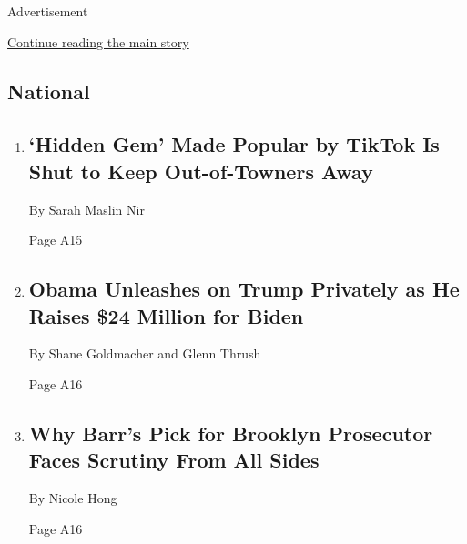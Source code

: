 Advertisement

\protect\hyperlink{after-mid2}{Continue reading the main story}

\hypertarget{national}{%
\subsection{National}\label{national}}

\begin{enumerate}
\def\labelenumi{\arabic{enumi}.}
\item
  \href{/2020/07/29/nyregion/lake-solitude-closed-racism.html}{}

  \hypertarget{hidden-gem-made-popular-by-tiktok-is-shut-to-keep-out-of-towners-away}{%
  \subsection{`Hidden Gem' Made Popular by TikTok Is Shut to Keep
  Out-of-Towners
  Away}\label{hidden-gem-made-popular-by-tiktok-is-shut-to-keep-out-of-towners-away}}

  By Sarah Maslin Nir

  Page A15
\item
  \href{/2020/07/30/us/politics/obama-trump-biden.html}{}

  \hypertarget{obama-unleashes-on-trump-privately-as-he-raises-24-million-for-biden}{%
  \subsection{Obama Unleashes on Trump Privately as He Raises \$24
  Million for
  Biden}\label{obama-unleashes-on-trump-privately-as-he-raises-24-million-for-biden}}

  By Shane Goldmacher and Glenn Thrush

  Page A16
\item
  \href{/2020/07/30/nyregion/seth-ducharme-us-attorney-brooklyn.html}{}

  \hypertarget{why-barrs-pick-for-brooklyn-prosecutor-faces-scrutiny-from-all-sides}{%
  \subsection{Why Barr's Pick for Brooklyn Prosecutor Faces Scrutiny
  From All
  Sides}\label{why-barrs-pick-for-brooklyn-prosecutor-faces-scrutiny-from-all-sides}}

  By Nicole Hong

  Page A16
\end{enumerate}

